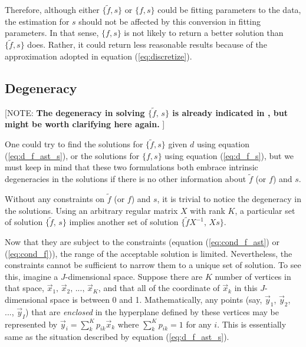 \documentclass[iop,numberedappendix,apj,]{emulateapj}
\def\fast{\tilde f}
\def\memoYF#1{\color{red}[NOTE: {\bf #1}]\color{black}}
\begin{document}
Therefore, although either $\{ \fast, s \}$ or $\{ f, s \}$ could be fitting parameters to the data, the estimation for $s$ should not be affected by this conversion in fitting parameters. 
In that sense, $\{ f, s \}$ is not likely to return a better solution than $\{ \fast, s \}$ does. 
Rather, it could return less reasonable results because of the approximation adopted in equation (\ref{eq:discretize}). 

\newpage

\subsection{Degeneracy}
\label{ss:degeneracy}

\memoYF{The degeneracy in solving $\{ \fast ,\,s\} $ is already indicated in \citet{Cowan2013}, but might be worth clarifying here again. }


One could try to find the solutions for $\{ \fast, s \}$ given $d$ using equation (\ref{eq:d_f_ast_s}), or the solutions for  $\{ f, s \}$ using equation (\ref{eq:d_f_s}), but we must keep in mind that 
these two formulations both embrace intrinsic degeneracies in the solutions if there is no other information about $\fast$ (or $f$) and $s$. 


Without any constraints on $\fast$ (or $f$) and $s$, it is trivial to notice the degeneracy in the solutions. 
Using an arbitrary regular matrix $X$ with rank $K$, a particular set of solution $\{ \fast ,\,s\}$ implies another set of solution $\{ \fast X^{-1},\,Xs\}$. 

Now that they are subject to the constraints (equation (\ref{eq:cond_f_ast}) or (\ref{eq:cond_f})), the range of the acceptable solution is limited. Nevertheless, the constraints cannot be sufficient to narrow them to a unique set of solution. 
%
To see this, %
imagine a $J$-dimensional space.
Suppose there are $K$ number of vertices in that space, $\vec x_1,\,\vec x_2,\,...,\,\vec x_K$, and that all of the coordinate of $\vec x_k$ in this $J$-dimensional space is between 0 and 1. 
Mathematically, any points (say, $\vec y_1$, $\vec y_2$, ..., $\vec y_I$) that are {\it enclosed} in the hyperplane defined by these vertices may be represented by $\vec y_i=\sum _k^K p_{ik} \vec x_k $ where $\sum _k^K p_{ik} = 1$ for any $i$. 
This is essentially same as the situation described by equation (\ref{eq:d_f_ast_s}). 
\end{document}
